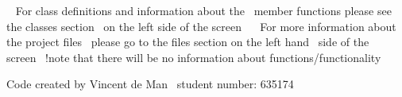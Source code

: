 ~\newline
 For class definitions and information about the~\newline
 member functions please see the classes section~\newline
 on the left side of the screen~\newline
 ~\newline
 For more information about the project files~\newline
 please go to the files section on the left hand~\newline
 side of the screen~\newline
 !note that there will be no information about functions/functionality~\newline
 ~\newline


Code created by Vincent de Man~\newline
 student number\+: 635174~\newline
 